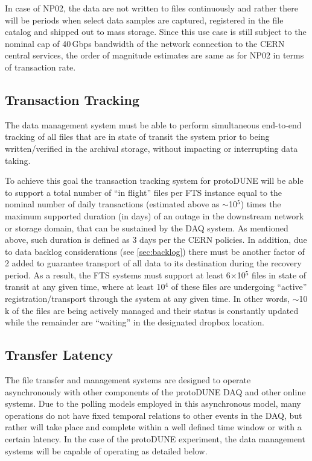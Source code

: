 \documentclass[12pt]{article}
\newcommand{\pd}{protoDUNE\xspace}
\begin{document}
{In case of NP02, the data are not written to files continuously and rather there will be periods when
select data samples are captured, registered in the file catalog and shipped out to mass storage.
Since this use case is still subject to the nominal cap of 40\,Gbps bandwidth of the network connection
to the CERN central services, the order of magnitude estimates are same as for NP02 in terms of transaction rate.

\subsection{Transaction Tracking}
The data management system must be able to perform simultaneous end-to-end tracking
of all files that are in state of transit the system prior to being written/verified in the archival storage,
without impacting or interrupting data taking. 

To achieve this goal the transaction tracking system for \pd will be
able to support a total number of ``in flight'' files per FTS instance equal to the nominal number of daily transactions
(estimated above as $\sim$10$^5$) times the maximum supported duration (in days)
of an outage in the downstream network or storage domain, that can be sustained by the DAQ system.
As mentioned above, such duration is defined as 3 days per the CERN policies. In addition, due to data backlog considerations
(see \ref{sec:backlog}) there must be another factor of 2 added to guarantee transport of all data to its destination during
the recovery period. As a result, the FTS systems must support at least 6$\times$10$^5$ files in state of transit at any given time,
where at least 10$^4$ of these files are undergoing ``active'' registration/transport through the system at any given time.
In other words, $\sim$10\,k of the files are being actively
managed and their status is constantly updated while the remainder are ``waiting'' in the designated dropbox location.

\subsection{Transfer Latency}
The file transfer and management systems are designed to operate asynchronously with other components of the \pd DAQ
and other online systems.
Due to the polling models employed in this asynchronous model, many operations do not have fixed temporal relations to other events in the DAQ,
but rather will take place and complete within a well defined time window or with a certain latency.  In the case of the \pd experiment,
the data management systems will be capable of operating as detailed below.

}
\end{document}
